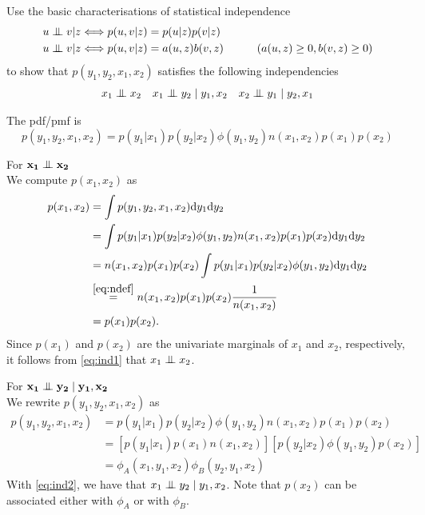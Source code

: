 \begin{exenumerate}

\item Use the basic characterisations of statistical independence
  \begin{align}
  u \mathrel{\perp\mspace{-10mu}\perp} v | z &\Longleftrightarrow p(u,v | z) = p(u|z) p(v | z) \label{eq:ind1}\\
  u \mathrel{\perp\mspace{-10mu}\perp} v | z &\Longleftrightarrow p(u,v | z) = a(u,z) b(v,z) \quad \quad \quad (a(u,z) \ge0, b(v,z) \ge 0) \label{eq:ind2}
  \end{align}
  to show that $p(y_1,y_2,x_1,x_2)$ satisfies the following independencies
\begin{align*}
  x_1 \mathrel{\perp\mspace{-10mu}\perp} x_2 &&  x_1 \mathrel{\perp\mspace{-10mu}\perp} y_2 \mid y_1, x_2 && x_2 \mathrel{\perp\mspace{-10mu}\perp} y_1 \mid y_2, x_1
\end{align*}

  \begin{solution}
    The pdf/pmf is
    $$p(y_1,y_2,x_1,x_2) = p(y_1 | x_1) p(y_2 | x_2) \phi(y_1,y_2) n(x_1,x_2) p(x_1) p(x_2)$$
    
    For $\mathbf{x_1 \mathrel{\perp\mspace{-10mu}\perp} x_2}$\\
    We compute $p(x_1,x_2)$ as
    \begin{align}
      p(x_1,x_2) & = \int p(y_1,y_2,x_1,x_2) \mathrm{d} y_1 \mathrm{d} y_2\\
      & =  \int p(y_1 | x_1) p(y_2 | x_2) \phi(y_1,y_2) n(x_1,x_2) p(x_1) p(x_2) \mathrm{d} y_1 \mathrm{d} y_2 \\
      & =  n(x_1,x_2) p(x_1) p(x_2) \int p(y_1 | x_1) p(y_2 | x_2) \phi(y_1,y_2) \mathrm{d} y_1 \mathrm{d} y_2\\
      & \stackrel{\eqref{eq:ndef}}=  n(x_1,x_2) p(x_1) p(x_2) \frac{1}{n(x_1,x_2)}\\
      & = p(x_1) p(x_2).
    \end{align}
    Since $p(x_1)$ and $p(x_2)$ are the univariate marginals of $x_1$ and $x_2$, respectively, it follows from \eqref{eq:ind1} that $x_1 \mathrel{\perp\mspace{-10mu}\perp} x_2$.

    \vspace{2ex}
    For $\mathbf{x_1 \mathrel{\perp\mspace{-10mu}\perp} y_2 \mid y_1, x_2}$\\
    We rewrite $p(y_1,y_2,x_1,x_2)$ as
    \begin{align}
      p(y_1,y_2,x_1,x_2) & =  p(y_1 | x_1) p(y_2 | x_2) \phi(y_1,y_2) n(x_1,x_2) p(x_1) p(x_2)\\
      & =  \left[p(y_1 | x_1) p(x_1)  n(x_1,x_2)\right]\left[ p(y_2 | x_2)\phi(y_1,y_2)p(x_2)\right]\\
      & = \phi_A(x_1,y_1,x_2) \phi_B(y_2,y_1,x_2)
    \end{align}
    With \eqref{eq:ind2}, we have that $x_1 \mathrel{\perp\mspace{-10mu}\perp} y_2 \mid y_1,x_2$. Note that $p(x_2)$ can be associated either with $\phi_A$ or with $\phi_B$.


\end{solution}
\end{exenumerate}
